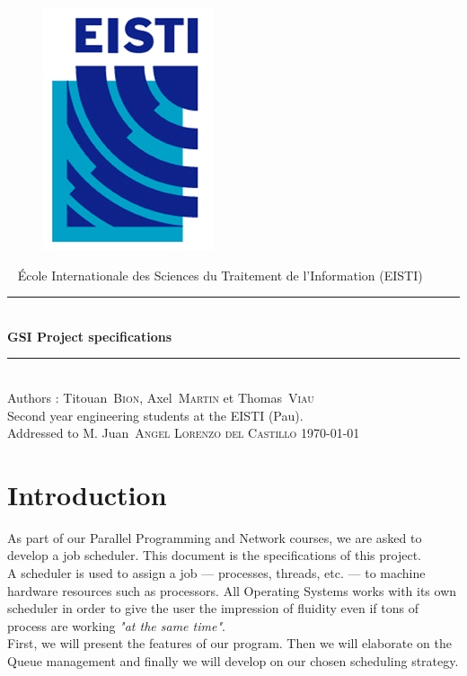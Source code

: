 \documentclass[a4paper,11pt]{article}
\newcommand*{\HRule}{\rule{\linewidth}{0.4mm}}  %
\newcommand*{\auteur}[2]{\large #1~\textsc{#2}} %
\newcommand{\pretitre}{École Internationale des Sciences du Traitement de l'Information (EISTI)}
\newcommand{\grostitre}{GSI Project specifications}
\newcommand{\auteurs}{Authors : \auteur{Titouan}{Bion}, \auteur{Axel}{Martin} et \auteur{Thomas}{Viau} \\ Second year engineering students at the EISTI (Pau).}
\newcommand{\correcteurs}{Addressed to M. \auteur{Juan}{Angel Lorenzo del Castillo}}
\newcommand{\madate}{\today} %
\begin{document}


\begin{titlepage}
\begin{figure}[h]
\includegraphics[scale=1]{images/Logo_EISTI.jpg}
\hfill
\end{figure}
  \begin{center}
    ~
    \vfill
    {\large\pretitre\\}           %
    \vspace{2cm}
    \HRule \\[0.4cm]
    {\Huge\bf\grostitre\\[0.4cm]} %
    \HRule \\[0.4cm]
    \vspace{2cm}
    \auteurs\\                    %
    \medskip
    \vfill
   	\correcteurs
    \vfill
    {\large\madate}               %
  \end{center}
\end{titlepage}



\tableofcontents

\newpage

\section{Introduction}

As part of our Parallel Programming and Network courses, we are asked to develop a job scheduler. This document is the specifications of this project.\\
A scheduler is used to assign a job --- processes, threads, etc. --- to machine hardware resources such as processors. All Operating Systems works with its own scheduler in order to give the user the impression of fluidity even if tons of process are working \textit{"at the same time"}.\\
First, we will present the features of our program. Then we will elaborate on the Queue management and finally we will develop on our chosen scheduling strategy.
\end{document}
